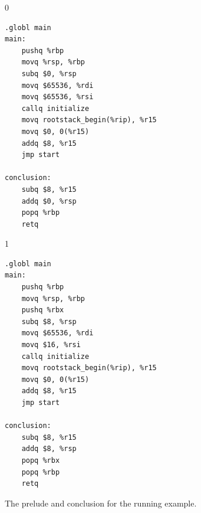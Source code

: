 \documentclass[7x10]{TimesAPriori_MIT}%
\def\racketEd{0}
\def\pythonEd{1}
\def\edition{1}
\numberwithin{theorem}{chapter}
\numberwithin{definition}{chapter}
\numberwithin{equation}{chapter}
\begin{document}
\begin{figure}[htbp]
  \begin{tcolorbox}[colback=white]
{\if\edition\racketEd    
\begin{minipage}[t]{0.5\textwidth}
\begin{lstlisting}[basicstyle=\ttfamily\footnotesize]
	.globl main
main:
    pushq %rbp
    movq %rsp, %rbp
    subq $0, %rsp
    movq $65536, %rdi
    movq $65536, %rsi
    callq initialize
    movq rootstack_begin(%rip), %r15
    movq $0, 0(%r15)
    addq $8, %r15
    jmp start
    
conclusion:
    subq $8, %r15
    addq $0, %rsp
    popq %rbp
    retq
\end{lstlisting}
\end{minipage}
    \fi}
{\if\edition\pythonEd    
\begin{minipage}[t]{0.5\textwidth}
\begin{lstlisting}[basicstyle=\ttfamily\footnotesize]
    .globl main
main:
    pushq %rbp
    movq %rsp, %rbp
    pushq %rbx
    subq $8, %rsp
    movq $65536, %rdi
    movq $16, %rsi
    callq initialize
    movq rootstack_begin(%rip), %r15
    movq $0, 0(%r15)
    addq $8, %r15
    jmp start

conclusion:
    subq $8, %r15
    addq $8, %rsp
    popq %rbx
    popq %rbp
    retq 
\end{lstlisting}
\end{minipage}
\fi}
  \end{tcolorbox}

  \caption{The prelude and conclusion for the running example.}
\label{fig:print-x86-output-gc}
\end{figure}
\end{document}
